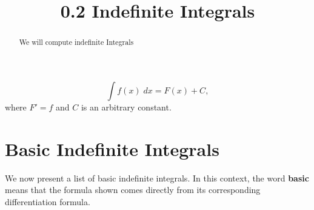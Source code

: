 \documentclass[handout]{ximera}
\title{0.2 Indefinite Integrals}
\begin{document}
\begin{abstract}
We will compute indefinite Integrals
\end{abstract}

\maketitle

\begin{definition}
\[
\int f(x) \; dx = F(x) + C,
\]
where $F' = f$ and $C$ is an arbitrary constant.

\end{definition}


\section{Basic Indefinite Integrals}

We now present a list of basic indefinite integrals.  In this context, the word \textbf{basic} means that the formula shown
comes directly from its corresponding differentiation formula.
\end{document}
